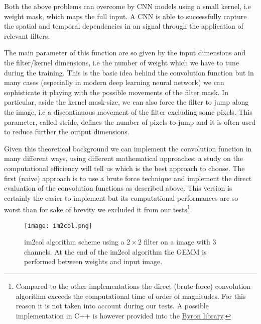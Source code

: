 \documentclass{standalone}
\begin{document}
Both the above problems can overcome by CNN models using a small kernel, i.e weight mask, which maps the full input.
A CNN is able to successfully capture the spatial and temporal dependencies in an signal through the application of relevant filters.

The main parameter of this function are so given by the input dimensions and the filter/kernel dimensions, i.e the number of weight which we have to tune during the training.
This is the basic idea behind the convolution function but in many cases (especially in modern deep learning neural network) we can sophisticate it playing with the possible movements of the filter mask.
In particular, aside the kernel mask-size, we can also force the filter to jump along the image, i.e a discontinuous movement of the filter excluding some pixels.
This parameter, called \textsf{stride}, defines the number of pixels to jump and it is often used to reduce further the output dimensions.

Given this theoretical background we can implement the convolution function in many different ways, using different mathematical approaches: a study on the computational efficiency will tell us which is the best approach to choose.
The first (naive) approach is to use a brute force technique and implement the direct evaluation of the convolution functions as described above.
This version is certainly the easier to implement but its computational performances are so worst than for sake of brevity we excluded it from our tests\footnote{
  Compared to the other implementations the direct (brute force) convolution algorithm exceeds the computational time of order of magnitudes.
  For this reason it is not taken into account during our tests.
  A possible implementation in \textsf{C++} is however provided into the \href{https://github.com/Nico-Curti/Byron/blob/master/utility/winograd_test.cpp}{\textsf{Byron} library}.
}.


\begin{center}
\begin{figure}[htbp]
\centering
\texttt{[image: im2col.png]}
\caption{\textsf{im2col} algorithm scheme using a $2\times2$ filter on a image with 3 channels.
At the end of the \textsf{im2col} algorithm the \textsf{GEMM} is performed between weights and input image.
}
\label{fig:im2col}
\end{figure}
\end{center}
\end{document}

